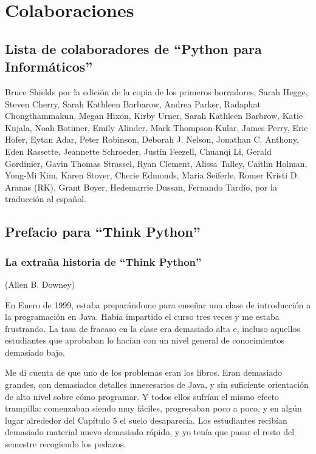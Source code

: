 
\chapter{Colaboraciones}
\section*{Lista de colaboradores de ``Python para Informáticos''}

Bruce Shields por la edición de la copia de los primeros borradores,
Sarah Hegge,
Steven Cherry,
Sarah Kathleen Barbarow,
Andrea Parker,
Radaphat Chongthammakun,
Megan Hixon,
Kirby Urner,
Sarah Kathleen Barbrow,
Katie Kujala,
Noah Botimer,
Emily Alinder,
Mark Thompson-Kular,
James Perry,
Eric Hofer,
Eytan Adar,
Peter Robinson,
Deborah J. Nelson,
Jonathan C. Anthony,
Eden Rassette,
Jeannette Schroeder,
Justin Feezell,
Chuanqi Li,
Gerald Gordinier,
Gavin Thomas Strassel,
Ryan Clement,
Alissa Talley,
Caitlin Holman,
Yong-Mi Kim,
Karen Stover,
Cherie Edmonds,
Maria Seiferle,
Romer Kristi D. Aranas (RK),
Grant Boyer,
Hedemarrie Dussan,
Fernando Tardío, por la traducción al español.


\section*{Prefacio para ``Think Python''}

\subsection*{La extraña historia de ``Think Python''}

(Allen B. Downey)

En Enero de 1999, estaba preparándome para enseñar una clase de introducción
a la programación en Java. Había impartido el curso tres veces y me estaba
frustrando. La tasa de fracaso en la clase era demasiado alta e, incluso
aquellos estudiantes que aprobaban lo hacían con un nivel general de conocimientos
demasiado bajo.

Me di cuenta de que uno de los problemas eran los libros.
Eran demasiado grandes, con demasiados detalles innecesarios de Java, y
sin suficiente orientación de alto nivel sobre cómo programar. Y todos ellos
sufrían el mismo efecto trampilla: comenzaban siendo muy fáciles,
progresaban poco a poco, y en algún lugar alrededor del Capítulo 5 el suelo
desaparecía. Los estudiantes recibían demasiado material nuevo demasiado rápido,
y yo tenía que pasar el resto del semestre recogiendo los pedazos.


